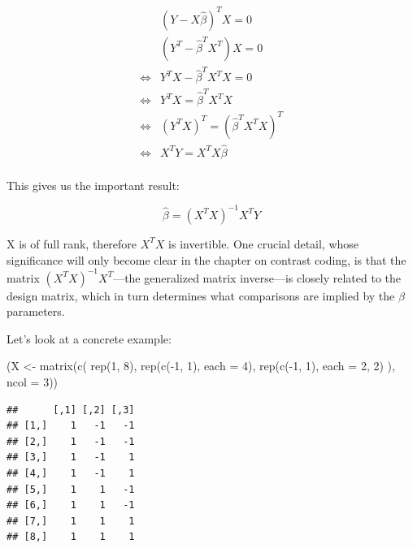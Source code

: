 \documentclass[
  12pt,
]{krantz}
\newenvironment{Shaded}{\begin{snugshade}}{\end{snugshade}}
\newcommand{\AttributeTok}[1]{\textcolor[rgb]{0.77,0.63,0.00}{#1}}
\newcommand{\DecValTok}[1]{\textcolor[rgb]{0.00,0.00,0.81}{#1}}
\newcommand{\FunctionTok}[1]{\textcolor[rgb]{0.00,0.00,0.00}{#1}}
\newcommand{\NormalTok}[1]{#1}
\newcommand{\OtherTok}[1]{\textcolor[rgb]{0.56,0.35,0.01}{#1}}
\newcommand{\SpecialCharTok}[1]{\textcolor[rgb]{0.00,0.00,0.00}{#1}}
\theoremstyle{definition}
\theoremstyle{definition}
\theoremstyle{definition}
\theoremstyle{definition}
\theoremstyle{remark}
\begin{document}
\begin{equation}
\begin{split}
~& (Y- X\hat\beta)^T X = 0  \\
~& (Y^T- \hat\beta^T X^T)X = 0\\
\Leftrightarrow& Y^T X - \hat\beta^TX^T X = 0 \quad  \\
\Leftrightarrow& Y^T X = \hat\beta^TX^T X \\
\Leftrightarrow& (Y^T X)^T = (\hat\beta^TX^T X)^T \\
\Leftrightarrow& X^T Y = X^TX\hat\beta\\
\end{split}
\end{equation}

This gives us the important result:

\begin{equation}
\hat\beta = (X^TX)^{-1}X^T Y
\end{equation}

X is of full rank, therefore \(X^TX\) is invertible. One crucial detail, whose significance will only become clear in the chapter on contrast coding, is that the matrix \((X^TX)^{-1}X^T\)---the generalized matrix inverse---is closely related to the design matrix, which in turn determines what comparisons are implied by the \(\beta\) parameters.

Let's look at a concrete example:

\begin{Shaded}
\begin{Highlighting}[]
\NormalTok{(X }\OtherTok{\textless{}{-}} \FunctionTok{matrix}\NormalTok{(}\FunctionTok{c}\NormalTok{(}
  \FunctionTok{rep}\NormalTok{(}\DecValTok{1}\NormalTok{, }\DecValTok{8}\NormalTok{), }\FunctionTok{rep}\NormalTok{(}\FunctionTok{c}\NormalTok{(}\SpecialCharTok{{-}}\DecValTok{1}\NormalTok{, }\DecValTok{1}\NormalTok{), }\AttributeTok{each =} \DecValTok{4}\NormalTok{),}
  \FunctionTok{rep}\NormalTok{(}\FunctionTok{c}\NormalTok{(}\SpecialCharTok{{-}}\DecValTok{1}\NormalTok{, }\DecValTok{1}\NormalTok{), }\AttributeTok{each =} \DecValTok{2}\NormalTok{, }\DecValTok{2}\NormalTok{)}
\NormalTok{), }\AttributeTok{ncol =} \DecValTok{3}\NormalTok{))}
\end{Highlighting}
\end{Shaded}

\begin{verbatim}
##      [,1] [,2] [,3]
## [1,]    1   -1   -1
## [2,]    1   -1   -1
## [3,]    1   -1    1
## [4,]    1   -1    1
## [5,]    1    1   -1
## [6,]    1    1   -1
## [7,]    1    1    1
## [8,]    1    1    1
\end{verbatim}
\end{document}
